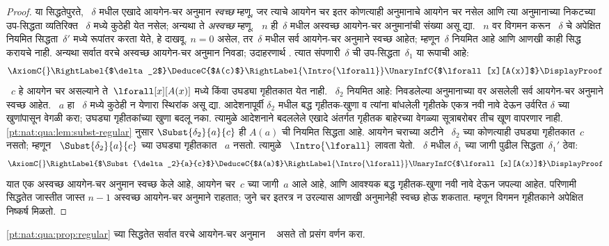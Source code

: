 \begin{proof}
या सिद्धतेपुरते,
~$\delta$ मधील एखादे
आयगेन-चर अनुमान
\emph{स्वच्छ} म्हणू,
जर त्याचे आयगेन चर
इतर कोणत्याही अनुमानाचे
आयगेन चर नसेल आणि
त्या अनुमानाच्या निकटच्या
उप-सिद्धता व्यतिरिक्त
~$\delta$ मध्ये
कुठेही येत नसेल;
अन्यथा ते \emph{अस्वच्छ}
म्हणू. ~$n$ ही~$\delta$
मधील अस्वच्छ आयगेन-चर
अनुमानांची संख्या असू द्या.
~$n$ वर विगमन करून
~$\delta$ चे अपेक्षित
नियमित सिद्धता~$\delta'$
मध्ये रूपांतर करता येते,
हे दाखवू. $n=0$ असेल,
तर~$\delta$ मधील सर्व
आयगेन-चर अनुमाने स्वच्छ
आहेत; म्हणून~$\delta$
नियमित आहे आणि आणखी
काही सिद्ध करायचे नाही.
अन्यथा सर्वात वरचे
अस्वच्छ आयगेन-चर अनुमान
निवडा; उदाहरणार्थ
\Intro{\lforall}.
त्यात संपणारी~$\delta$
ची उप-सिद्धता~$\delta_1$
या रूपाची आहे:
    \[
    \AxiomC{}
    \RightLabel{$\delta_2$}
    \DeduceC{$A(c)$}
    \RightLabel{\Intro{\lforall}}
    \UnaryInfC{$\lforall[x][A(x)]$}
    \DisplayProof
    \]
~$c$ हे आयगेन चर असल्याने
ते~$\lforall[x][A(x)]$
मध्ये किंवा उघड्या गृहीतकात
येत नाही. ~$\delta_2$
नियमित आहे: निवडलेल्या
अनुमानाच्या वर असलेली
सर्व आयगेन-चर अनुमाने
स्वच्छ आहेत. ~$a$ हा
~$\delta$ मध्ये कुठेही
न येणारा स्थिरांक
असू द्या. आदेशनापूर्वी $\delta_2$ मधील
बद्ध गृहीतक-खुणा व त्यांना बांधलेली गृहीतके एकत्र
नवी नावे देऊन उर्वरित $\delta$ च्या खुणांपासून
वेगळी करा; उघड्या गृहीतकांच्या खुणा बदलू नका.
त्यामुळे आदेशनाने बदललेले एखादे अंतर्गत गृहीतक
बाहेरच्या वेगळ्या सूत्राबरोबर तीच खूण वापरणार नाही.
\ref{pt:nat:qua:lem:subst-regular}
नुसार
$\Subst{\delta_2}{a}{c}$
ही $A(a)$ ची नियमित
सिद्धता आहे.
आयगेन चराच्या अटीने
~$\delta_2$ च्या कोणत्याही
उघड्या गृहीतकात~$c$
नसतो; म्हणून
~$\Subst{\delta_2}{a}{c}$
च्या उघड्या गृहीतकात
~$a$ नसतो. त्यामुळे
~$\Intro{\lforall}$
लावता येतो.
~$\delta$ मधील
$\delta_1$ च्या जागी
पुढील सिद्धता~$\delta_1'$
ठेवा:
    \[
    \AxiomC{}
    \RightLabel{$\Subst{\delta_2}{a}{c}$}
    \DeduceC{$A(a)$}
    \RightLabel{\Intro{\lforall}}
    \UnaryInfC{$\lforall[x][A(x)]$}
    \DisplayProof
    \]
यात एक अस्वच्छ आयगेन-चर
अनुमान स्वच्छ केले आहे,
आयगेन चर~$c$ च्या जागी~$a$ आले आहे,
आणि आवश्यक बद्ध गृहीतक-खुणा नवी नावे देऊन जपल्या आहेत.
परिणामी सिद्धतेत
जास्तीत जास्त $n-1$ अस्वच्छ आयगेन-चर
अनुमाने राहतात; जुने चर इतरत्र न उरल्यास
आणखी अनुमानेही स्वच्छ होऊ शकतात. म्हणून
विगमन गृहीतकाने अपेक्षित
निष्कर्ष मिळतो.
\end{proof}

\begin{prob}
\ref{pt:nat:qua:prop:regular} च्या
सिद्धतेत सर्वात वरचे
आयगेन-चर अनुमान
~\Elim{\lexists} असते
तो प्रसंग वर्णन करा.
\end{prob}

